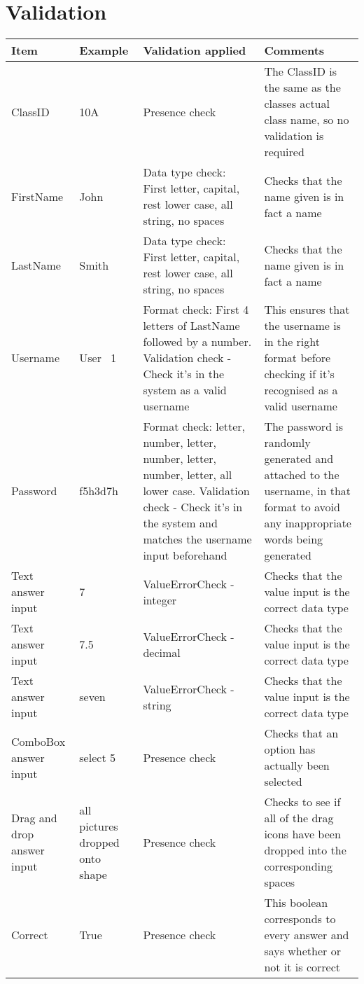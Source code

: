\section{Validation}

\begin{center}
\begin{tabular}{|p{2cm}|p{3cm}|p{4cm}|p{4cm}|} \hline
\textbf{Item} & \textbf{Example} & \textbf{Validation applied} & \textbf{Comments} \\ \hline
ClassID & 10A & Presence check & The ClassID is the same as the classes actual class name, so no validation is required \\ \hline
FirstName & John & Data type check: First letter, capital, rest lower case, all string, no spaces & Checks that the name given is in fact a name \\ \hline
LastName & Smith & Data type check: First letter, capital, rest lower case, all string, no spaces & Checks that the name given is in fact a name \\ \hline
Username & User \ 1 & Format check: First 4 letters of LastName followed by a number. Validation check - Check it's in the system as a valid username & This ensures that the username is in the right format before checking if it's recognised as a valid username \\ \hline
Password & f5h3d7h & Format check: letter, number, letter, number, letter, number, letter, all lower case. Validation check - Check it's in the system and matches the username input beforehand & The password is randomly generated and attached to the username, in that format to avoid any inappropriate words being generated \\ \hline
Text answer input & 7 & ValueErrorCheck - integer & Checks that the value input is the correct data type \\ \hline
Text answer input & 7.5 & ValueErrorCheck - decimal & Checks that the value input is the correct data type \\ \hline
Text answer input & seven & ValueErrorCheck - string & Checks that the value input is the correct data type  \\ \hline
ComboBox answer input & select 5 & Presence check & Checks that an option has actually been selected \\ \hline
Drag and drop answer input & all pictures dropped onto shape & Presence check & Checks to see if all of the drag icons have been dropped into the corresponding spaces \\ \hline
Correct & True & Presence check & This boolean corresponds to every answer and says whether or not it is correct \\ \hline
\end{tabular}
\end{center}

